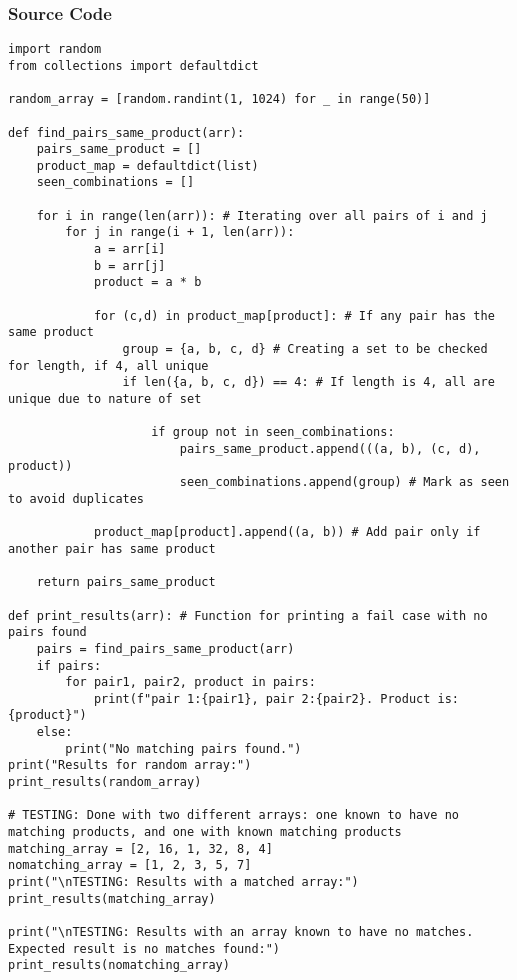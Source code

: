\documentclass{article}
\begin{document}
\subsubsection*{Source Code}
\begin{lstlisting}
import random
from collections import defaultdict

random_array = [random.randint(1, 1024) for _ in range(50)]

def find_pairs_same_product(arr):
    pairs_same_product = []
    product_map = defaultdict(list)
    seen_combinations = []

    for i in range(len(arr)): # Iterating over all pairs of i and j
        for j in range(i + 1, len(arr)):
            a = arr[i]
            b = arr[j]
            product = a * b

            for (c,d) in product_map[product]: # If any pair has the same product
                group = {a, b, c, d} # Creating a set to be checked for length, if 4, all unique
                if len({a, b, c, d}) == 4: # If length is 4, all are unique due to nature of set

                    if group not in seen_combinations:
                        pairs_same_product.append(((a, b), (c, d), product))
                        seen_combinations.append(group) # Mark as seen to avoid duplicates

            product_map[product].append((a, b)) # Add pair only if another pair has same product

    return pairs_same_product

def print_results(arr): # Function for printing a fail case with no pairs found
    pairs = find_pairs_same_product(arr)
    if pairs:
        for pair1, pair2, product in pairs:
            print(f"pair 1:{pair1}, pair 2:{pair2}. Product is: {product}")
    else:
        print("No matching pairs found.")
print("Results for random array:")
print_results(random_array)

# TESTING: Done with two different arrays: one known to have no matching products, and one with known matching products
matching_array = [2, 16, 1, 32, 8, 4]
nomatching_array = [1, 2, 3, 5, 7]
print("\nTESTING: Results with a matched array:")
print_results(matching_array)

print("\nTESTING: Results with an array known to have no matches. Expected result is no matches found:")
print_results(nomatching_array)

\end{lstlisting}
\end{document}

